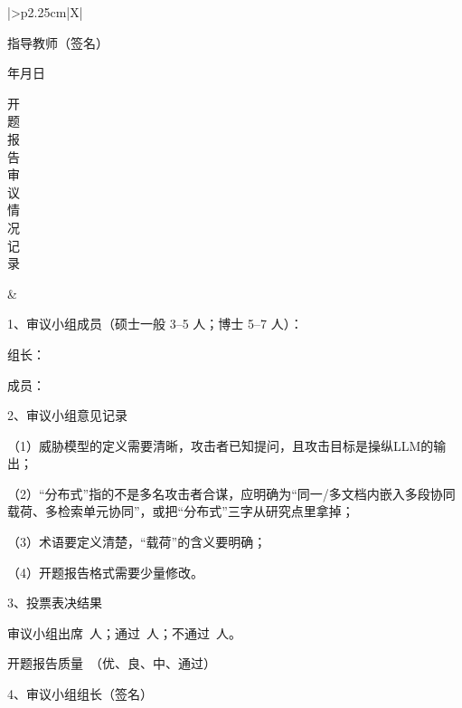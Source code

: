 \begin{tabularx}{\FrameTabularWidth}{|>{\centering\arraybackslash}p{2.25cm}|X|}
{      \vfill
      \hfill 指导教师（签名）\sigspace\par
      \vspace{0.55cm}
      \hfill 年\hspace{1.2cm}月\hspace{1.2cm}日\hspace{0.8cm}\vspace{5pt}} \tabularnewline \hline
  \parbox[t][8.05cm][c]{2.05cm}{\centering 开\\题\\报\\告\\审\\议\\情\\况\\记\\录}
    & \begin{minipage}[t]{\linewidth}\vspace{0pt}%
      1、审议小组成员（硕士一般 3--5 人；博士 5--7 人）：\par
      \hspace{2em}组长：\par
      \hspace{2em}成员：\par\vspace{0.1cm}
      2、审议小组意见记录\par\vspace{0.1cm}
      （1）威胁模型的定义需要清晰，攻击者已知提问，且攻击目标是操纵LLM的输出；\par
      （2）“分布式”指的不是多名攻击者合谋，应明确为“同一/多文档内嵌入多段协同载荷、多检索单元协同”，或把“分布式”三字从研究点里拿掉；\par
      （3）术语要定义清楚，“载荷”的含义要明确；\par
      （4）开题报告格式需要少量修改。\par\vspace{0.02cm}
      3、投票表决结果\par
      \hspace{2em}审议小组出席\underline{\makebox[1.5cm]{}}\ 人；通过\underline{\makebox[1.5cm]{}}\ 人；不通过\underline{\makebox[1.5cm]{}}\ 人。\par
      \hspace{2em}开题报告质量\underline{\makebox[4.0cm]{}}\ （优、良、中、通过）\par\vspace{0.12cm}
      4、审议小组组长（签名）\par

\end{minipage}
\end{tabularx}
